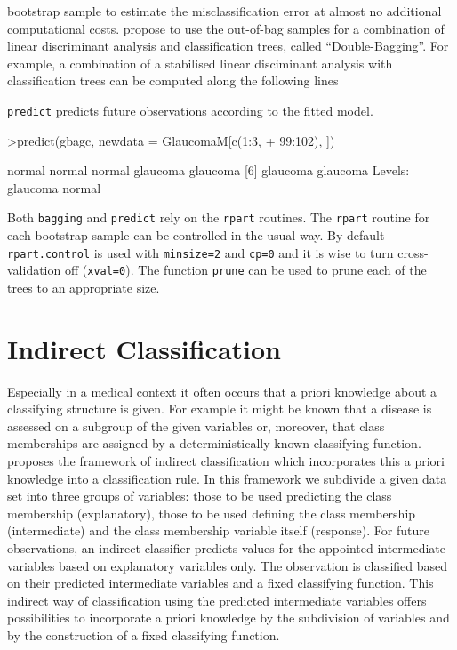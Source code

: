 \documentclass[11pt]{article}
\begin{document}
bootstrap sample to estimate the misclassification error at almost no
additional computational costs. 
\cite{double-bag:2002} propose to use the
out-of-bag samples for a combination of linear discriminant analysis and
classification trees, called ``Double-Bagging''. For example, a combination
of a stabilised linear disciminant analysis with classification trees can be
computed along the following lines
\begin{Schunk}
\end{Schunk}
\texttt{predict} predicts future observations according to the 
fitted model.
\begin{Schunk}
\begin{Sinput}
>predict(gbagc, newdata = GlaucomaM[c(1:3, 
+     99:102), ])
\end{Sinput}
\begin{Soutput}
[1] normal   normal   normal   glaucoma glaucoma
[6] glaucoma glaucoma
Levels: glaucoma normal
\end{Soutput}
\end{Schunk}
Both \texttt{bagging} and \texttt{predict} rely on the \texttt{rpart}
routines.  The \texttt{rpart} routine for each bootstrap sample
can be controlled in the usual way. By default \texttt{rpart.control} is used
with \texttt{minsize=2} and \texttt{cp=0} and it is wise to turn
cross-validation off (\texttt{xval=0}). The function \texttt{prune} can
be used to prune each of the trees to an
appropriate size.

\section{Indirect Classification}
Especially in a medical context it often occurs that a priori 
knowledge about a classifying structure is given. For example 
it might be known that a disease is assessed on a subgroup of 
the given variables or, moreover, that class memberships are 
assigned by a deterministically known classifying function. 
\cite{hand:2001} proposes the framework of indirect classification 
which incorporates this a priori knowledge into a classification rule. 
In this framework we subdivide a given data set into three groups of 
variables: those to be used  predicting the class membership 
(explanatory), those to be used defining the class membership 
(intermediate) and the class membership variable itself (response). 
For future observations, an indirect classifier predicts values 
for the appointed intermediate variables based
on explanatory variables only. The observation is classified 
based on their predicted intermediate variables and a fixed 
classifying function. This indirect way of classification using 
the predicted intermediate variables offers possibilities to 
incorporate a priori knowledge by the subdivision of variables and 
by the construction of a fixed classifying function.
\end{document}
